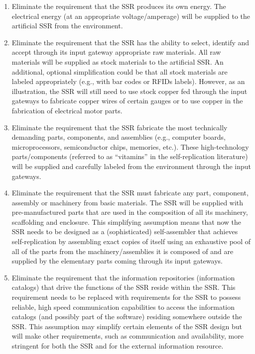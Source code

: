 \begin{enumerate}
\item Eliminate the requirement that the SSR produces its own energy.
The electrical energy (at an appropriate voltage/amperage) will be
supplied to the artificial SSR from the environment.
\item Eliminate the requirement that the SSR has the ability to select,
identify and accept through its input gateway appropriate raw
materials. All raw materials will be supplied as stock materials to the
artificial SSR. An additional, optional simplification could be that all stock
materials are labeled appropriately (e.g., with bar codes or RFIDs labels). 
However, as an illustration, the SSR will still need to use
stock copper fed through the input gateways to fabricate copper wires
of certain gauges or to use copper in the fabrication of electrical
motor parts.
\item Eliminate the requirement that the SSR fabricate the most technically
demanding parts, components, and assemblies (e.g.,
computer boards, microprocessors, semiconductor chips, memories,
etc.). These high-technology parts/components (referred to as ``vitamins'' in the
self-replication literature) will be supplied and carefully
labeled from the environment through the input gateways.
\item Eliminate the requirement that the SSR must fabricate any part,
component, assembly or machinery from basic materials. The SSR will be supplied
with pre-manufactured parts that are used in the composition of all
its machinery, scaffolding and enclosure. This simplifying assumption
means that now the SSR needs to be designed as a (sophisticated)
self-assembler that achieves self-replication by assembling exact
copies of itself using an exhaustive pool of all of the parts from the
machinery/assemblies it is composed of and are supplied by the elementary
parts coming through its input gateways.
\item Eliminate the requirement that the information repositories
(information catalogs) that drive the functions of the SSR reside
within the SSR. This requirement needs to be replaced with requirements
for the SSR to possess reliable, high speed communication capabilities
to access the information catalogs (and possibly part of the software)
residing somewhere outside the SSR. This assumption may simplify
certain elements of the SSR design but will make other
requirements, such as communication and availability, more stringent for both the
SSR and for the external information resource. 
\end{enumerate}

